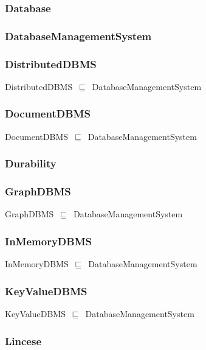 \documentclass{article}
\begin{document}
\subsubsection*{Database}

\subsubsection*{DatabaseManagementSystem}

\subsubsection*{DistributedDBMS}

DistributedDBMS~\ensuremath{\sqsubseteq}~DatabaseManagementSystem~

\subsubsection*{DocumentDBMS}

DocumentDBMS~\ensuremath{\sqsubseteq}~DatabaseManagementSystem~

\subsubsection*{Durability}

\subsubsection*{GraphDBMS}

GraphDBMS~\ensuremath{\sqsubseteq}~DatabaseManagementSystem~

\subsubsection*{InMemoryDBMS}

InMemoryDBMS~\ensuremath{\sqsubseteq}~DatabaseManagementSystem~

\subsubsection*{KeyValueDBMS}

KeyValueDBMS~\ensuremath{\sqsubseteq}~DatabaseManagementSystem~

\subsubsection*{Lincese}
\end{document}
